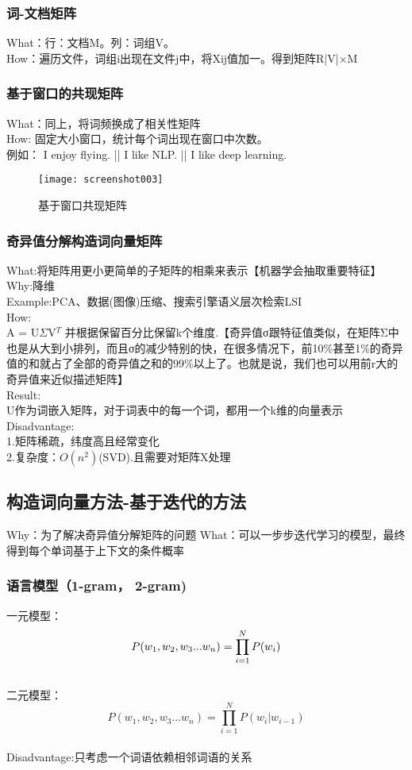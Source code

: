 \documentclass[
10pt, %
a4paper, %
oneside, %
headinclude,footinclude, %
BCOR5mm, %
]{scrartcl}
\begin{document}
\subsubsection{\color{blue}词-文档矩阵}
What：行：文档M。列：词组V。
\\How：遍历文件，词组i出现在文件j中，将Xij值加一。得到矩阵R|V|×M
\subsubsection{\color{blue}基于窗口的共现矩阵}
What：同上，将词频换成了相关性矩阵
\\How: 固定大小窗口，统计每个词出现在窗口中次数。
\\\indent 例如： I enjoy flying. || I like NLP. || I like deep learning. 
\begin{figure}[!htb]
	\centering
	\texttt{[image: screenshot003]}
	\caption{基于窗口共现矩阵}
	\label{fig:screenshot003}
\end{figure}
\subsubsection{\color{blue}奇异值分解构造词向量矩阵}
What:将矩阵用更小更简单的子矩阵的相乘来表示【机器学会抽取重要特征】
\\Why:降维
\\Example:PCA、数据(图像)压缩、搜索引擎语义层次检索LSI
\\How: \\\indent A = U$\Sigma$V$^T$ 并根据保留百分比保留k个维度.\indent【奇异值σ跟特征值类似，在矩阵Σ中也是从大到小排列，而且σ的减少特别的快，在很多情况下，前10\%甚至1\%的奇异值的和就占了全部的奇异值之和的99\%以上了。也就是说，我们也可以用前r大的奇异值来近似描述矩阵】
\\Result: \\\indent U作为词嵌入矩阵，对于词表中的每一个词，都用一个k维的向量表示
\\Disadvantage:\\\indent 1.矩阵稀疏，纬度高且经常变化\\\indent 2.复杂度：$O(n^2)$(SVD).且需要对矩阵X处理
\subsection{\color{red}构造词向量方法-基于迭代的方法}
Why：为了解决奇异值分解矩阵的问题
What：可以一步步迭代学习的模型，最终得到每个单词基于上下文的条件概率
\subsubsection{\color{blue}语言模型（1-gram， 2-gram)}
一元模型：
\begin{displaymath}
P(w_1, w_2, w_3...w_n) = \prod_{i=1}^{N}P(w_i)\\
\end{displaymath}
\\ 二元模型：
\begin{displaymath}
P(w_1, w_2, w_3...w_n) = \prod_{i=1}^{N}P(w_i | w_{i-1})
\end{displaymath}
\\Disadvantage:只考虑一个词语依赖相邻词语的关系
\end{document}
